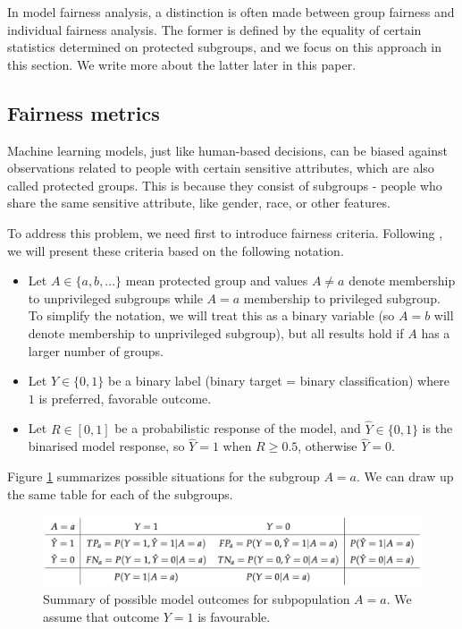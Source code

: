 In model fairness analysis, a distinction is often made between group
fairness and individual fairness analysis. The former is defined by the
equality of certain statistics determined on protected subgroups, and we
focus on this approach in this section. We write more about the latter
later in this paper.

\hypertarget{detect}{%
\subsection{Fairness metrics}\label{detect}}

Machine learning models, just like human-based decisions, can be biased
against observations related to people with certain sensitive
attributes, which are also called protected groups. This is because they
consist of subgroups - people who share the same sensitive attribute,
like gender, race, or other features.

To address this problem, we need first to introduce fairness criteria.
Following \citet{barocas-hardt-narayanan}, we will present these
criteria based on the following notation.

\begin{itemize}
\tightlist
\item
  Let \(A \in \{a,b, ...\}\) mean protected group and values
  \(A \neq a\) denote membership to unprivileged subgroups while
  \(A = a\) membership to privileged subgroup. To simplify the notation,
  we will treat this as a binary variable (so \(A = b\) will denote
  membership to unprivileged subgroup), but all results hold if \(A\)
  has a larger number of groups.\\
\item
  Let \(Y \in \{0,1\}\) be a binary label (binary target = binary
  classification) where \(1\) is preferred, favorable outcome.
\item
  Let \(R \in [0,1]\) be a probabilistic response of the model, and
  \(\hat{Y} \in \{0,1\}\) is the binarised model response, so
  \(\hat{Y} = 1\) when \(R \geq 0.5\), otherwise \(\hat{Y} = 0\).
\end{itemize}

Figure \ref{fig:fairnessTable1} summarizes possible situations for the
subgroup \(A=a\). We can draw up the same table for each of the
subgroups.

\begin{Schunk}
\begin{figure}

{\centering \includegraphics[width=1\linewidth]{table1} 

}

\caption[Summary of possible model outcomes for subpopulation $A = a$]{Summary of possible model outcomes for subpopulation $A = a$. We assume that outcome $Y = 1$ is favourable.}\label{fig:fairnessTable1}
\end{figure}
\end{Schunk}

